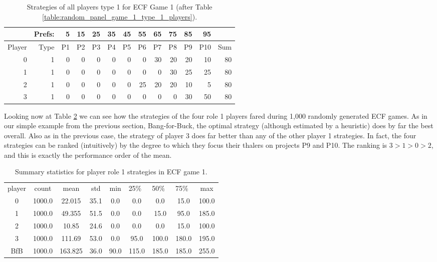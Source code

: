 \documentclass[11pt, oneside]{article}   	%
\begin{document}
 \begin{table}[h]
 \figtop
 
 \centering
\begin{tabular}{rrrrrrrrrrrrr}
 & Prefs: & 5 & 15 & 25 & 35 & 45 & 55 & 65 & 75 & 85 & 95 & \\  \hline
Player & Type & P1 & P2 & P3 & P4 & P5 & P6 & P7 & P8 & P9 & P10 & Sum \\ \hline
0 & 1 & 0 & 0 & 0 & 0 & 0 & 0 & 30 & 20 & 20 & 10 & 80 \\ 
1 & 1 & 0 & 0 & 0 & 0 & 0 & 0 & 0 & 30 & 25 & 25 & 80 \\ 
2 & 1 & 0 & 0 & 0 & 0 & 0 & 25 & 20 & 20 & 10 & 5 & 80 \\ 
3 & 1 & 0 & 0 & 0 & 0 & 0 & 0 & 0 & 0 & 30 & 50 & 80 \\ 

\end{tabular}
 \caption{Strategies of all players type 1 for ECF Game 1 (after Table \ref{table:random_panel_game_1_type_1_players}).}
 \label{table:random_panel_game_1_type_1_players_2}
 \figbot
\end{table}
Looking now at Table \ref{table:summary_game1_role1} we can see how the strategies of the four role 1 players fared during 1,000 randomly generated ECF games. As in our simple example from the previous section, Bang-for-Buck, the optimal strategy (although estimated by a heuristic) does by far the best overall. Also as in the previous case, the strategy of player 3 does far better than any of the other player 1 strategies. In fact, the four strategies can be ranked (intuitively) by the degree to which they focus their thalers on projects P9 and P10. The ranking is $3 > 1> 0 > 2$, and this is exactly the performance order of the mean.
\begin{table}[h]
\figtop

\centering
\begin{tabular}{ccccccccc}
player & count & mean & std & min & 25\%\ & 50\%\ & 75\%\ & max \\ 
0 & 1000.0 & 22.015 & 35.1 & 0.0 & 0.0 & 0.0 & 15.0 & 100.0 \\ 
1 & 1000.0 & 49.355 & 51.5 & 0.0 & 0.0 & 15.0 & 95.0 & 185.0 \\ 
2 & 1000.0 & 10.85 & 24.6 & 0.0 & 0.0 & 0.0 & 15.0 & 100.0 \\ 
3 & 1000.0 & 111.69 & 53.0 & 0.0 & 95.0 & 100.0 & 180.0 & 195.0 \\ 
BfB & 1000.0 & 163.825 & 36.0 & 90.0 & 115.0 & 185.0 & 185.0 & 255.0 \\ \end{tabular}
\caption{Summary statistics for player role 1 strategies in ECF game 1.}
\label{table:summary_game1_role1}
\figbot
\end{table}
\end{document}
